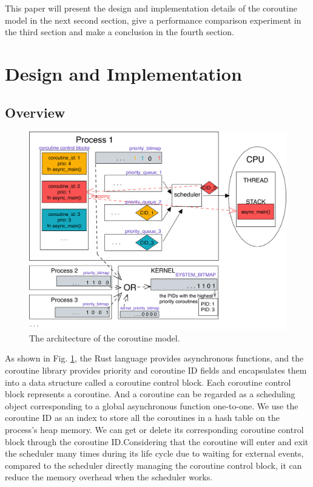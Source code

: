 \documentclass[conference]{IEEEtran}
\begin{document}
This paper will present the design and implementation details of the coroutine model in the next second section, give a performance comparison experiment in the third section and make a conclusion in the fourth section.

\section{Design and Implementation}

\subsection{Overview}

\begin{figure}[htbp]
\centerline{\includegraphics[width=\columnwidth]{overview.png}}
\caption{The architecture of the coroutine model.}
\label{overview}
\end{figure}

As shown in Fig. \ref{overview}, the Rust language provides asynchronous functions, and the coroutine library provides priority and coroutine ID fields and encapsulates them into a data structure called a coroutine control block. Each coroutine control block represents a coroutine. And a coroutine can be regarded as a scheduling object corresponding to a global asynchronous function one-to-one. We use the coroutine ID as an index to store all the coroutines in a hash table on the process's heap memory. We can get or delete its corresponding coroutine control block through the coroutine ID.Considering that the coroutine will enter and exit the scheduler many times during its life cycle due to waiting for external events, compared to the scheduler directly managing the coroutine control block, it can reduce the memory overhead when the scheduler works. 
\end{document}
